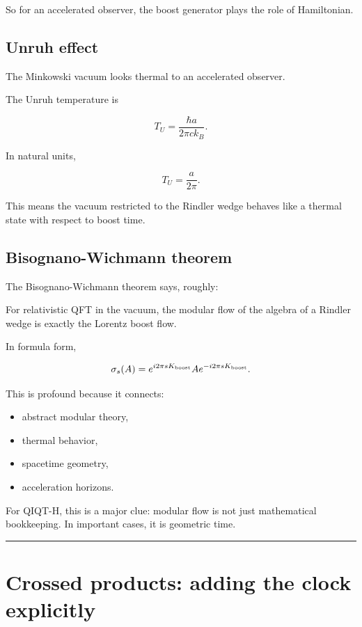 \documentclass[11pt,a4paper]{article}
\newenvironment{qiqtquote}{\begin{mdframed}[style=quotestyle]}{\end{mdframed}}
\begin{document}
So for an accelerated observer, the boost generator plays the role of Hamiltonian.

\subsection{Unruh effect}

The Minkowski vacuum looks thermal to an accelerated observer.

The Unruh temperature is

\[
T_U=\frac{\hbar a}{2\pi c k_B}.
\]

In natural units,

\[
T_U=\frac{a}{2\pi}.
\]

This means the vacuum restricted to the Rindler wedge behaves like a thermal state with respect to boost time.

\subsection{Bisognano-Wichmann theorem}

The Bisognano-Wichmann theorem says, roughly:

\begin{qiqtquote}
For relativistic QFT in the vacuum, the modular flow of the algebra of a Rindler wedge is exactly the Lorentz boost flow.
\end{qiqtquote}

In formula form,

\[
\sigma_s(A)=e^{i 2\pi s K_{\rm boost}} A e^{-i 2\pi s K_{\rm boost}}.
\]

This is profound because it connects:

\begin{itemize}
  \item abstract modular theory,
  \item thermal behavior,
  \item spacetime geometry,
  \item acceleration horizons.
\end{itemize}

For QIQT-H, this is a major clue: modular flow is not just mathematical bookkeeping. In important cases, it is geometric time.

\medskip\hrule\medskip

\section{Crossed products: adding the clock explicitly}
\end{document}
